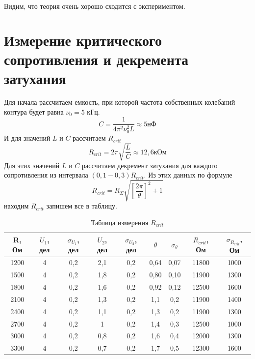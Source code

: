 \documentclass[a4paper, 12pt]{article}%
\begin{document}
Видим, что теория очень хорошо сходится с экспериментом.
\section*{Измерение критического сопротивления и декремента затухания}
Для начала рассчитаем емкость, при которой частота собственных колебаний контура будет равна $\nu_0 = 5$ кГц.
\[C = \dfrac{1}{4 \pi^2 \nu_0^2 L} \approx 5 \text{нФ}\]
И для значений $L$ и $C$ рассчитаем $R_{crit}$
\[R_{crit} = 2\pi\sqrt{\dfrac{L}{C}} \approx 12,6 \text{кОм}\]
Для этих значений $L$ и $C$ рассчитаем декремент затухания для каждого сопротивления из интервала $(0,1-0,3)R_{crit}$. Из этих данных по формуле 
\[R_{crit} = R_{\Sigma} \sqrt{\left[\dfrac{2\pi}{\theta}\right]^2 + 1}\]
находим $R_{crit}$ запишем все в таблицу. 

\begin{table}[h!]
\begin{center}
\begin{tabular}{|c|c|c|c|c|c|c|c|c|}
\hline
R, Ом & $U_1$, дел & $\sigma_{U_1}$, дел & $U_2$, дел & $\sigma_{U_2}$, дел & $\theta$ & $\sigma_{\theta}$ & $R_{crit}$, Ом & $\sigma_{R_{crit}}$, Ом \\ \hline
1200  & 4          & 0,2                 & 2,1        & 0,2                 & 0,64     & 0,07              & 11800          & 1000                    \\ \hline
1500  & 4          & 0,2                 & 1,8        & 0,2                 & 0,80     & 0,10              & 11900          & 1300                    \\ \hline
1800  & 4          & 0,2                 & 1,6        & 0,2                 & 0,92     & 0,12              & 12500          & 1600                    \\ \hline
2100  & 4          & 0,2                 & 1,3        & 0,2                 & 1,1      & 0,2               & 11900          & 1400                    \\ \hline
2400  & 4          & 0,2                 & 1,1        & 0,2                 & 1,3      & 0,2               & 11900          & 1300                    \\ \hline
2700  & 4          & 0,2                 & 1          & 0,2                 & 1,4      & 0,3               & 12500          & 1000                    \\ \hline
3000  & 4          & 0,2                 & 0,8        & 0,2                 & 1,6      & 0,4               & 12000          & 1300                    \\ \hline
3300  & 4          & 0,2                 & 0,7        & 0,2                 & 1,7      & 0,5               & 12300          & 1600                    \\ \hline
\end{tabular}
\caption{Таблица измерения $R_{crit}$}
\end{center}
\end{table}
\end{document}
